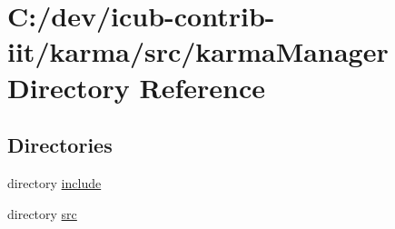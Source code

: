 \section{C\+:/dev/icub-\/contrib-\/iit/karma/src/karma\+Manager Directory Reference}
\label{dir_d5fc9e74ecd446ba07279cb903928e76}
\subsection*{Directories}
\begin{DoxyCompactItemize}
\item 
directory \hyperlink{dir_db5aab25642573dc60c61c7a424e232a}{include}
\item 
directory \hyperlink{dir_7487e53a8124ea55fc67b4fc4eb7b40c}{src}
\end{DoxyCompactItemize}
